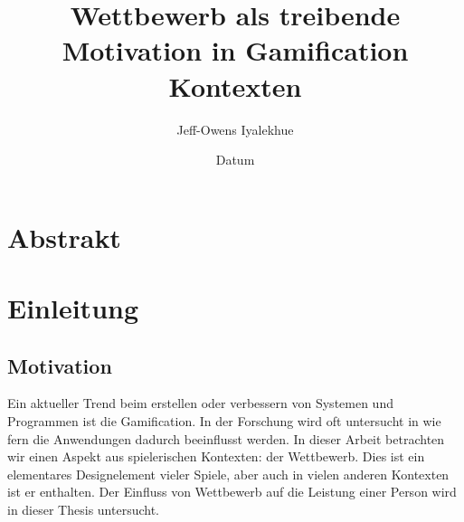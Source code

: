 %
% 
% 
%



\renewcommand{\Thema}{%
                        Wettbewerb als treibende Motivation in Gamification Kontexten}





\title{\Thema}
\author{Jeff-Owens Iyalekhue}
\date{Datum}


\tableofcontents %

\chapter{Abstrakt}

\chapter{Einleitung}
\section{Motivation}
Ein aktueller Trend beim erstellen oder verbessern von Systemen und Programmen ist die Gamification. In der Forschung wird oft untersucht in wie fern die Anwendungen dadurch beeinflusst werden. In dieser Arbeit betrachten wir einen Aspekt aus spielerischen Kontexten: der Wettbewerb.\newline
Dies ist ein elementares Designelement vieler Spiele, aber auch in vielen anderen Kontexten ist er enthalten. Der Einfluss von Wettbewerb auf die Leistung einer Person wird in dieser Thesis untersucht.

